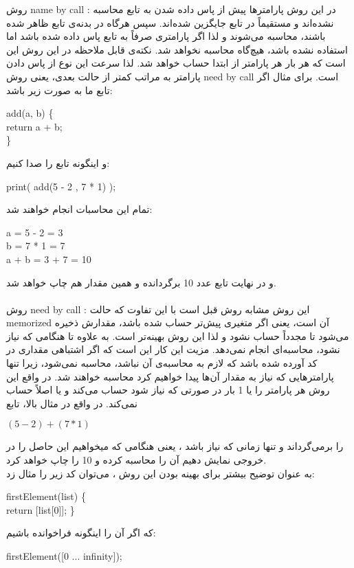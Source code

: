 

روش 
name by call
:
در این روش
پارامترها پیش از پاس داده شدن به تابع محاسبه نشده‌اند و مستقیماً
در تابع جایگزین شده‌اند.
 سپس هرگاه در بدنه‌ی تابع ظاهر شده باشند،
محاسبه می‌شوند و لذا اگر پارامتری صرفاً به تابع پاس داده شده باشد اما استفاده نشده باشد، هیچ‌گاه محاسبه نخواهد شد.
نکته‌ی قابل ملاحظه در این روش این است که
هر بار هر پارامتر از ابتدا حساب خواهد شد.
لذا سرعت این نوع از پاس دادن پارامتر به مراتب کمتر از حالت بعدی،
یعنی روش
need by call
است.
برای مثال اگر تابع ما به صورت زیر باشد:
\begin{latin}
add(a, b)
\small\{
\\
return a + b;
\\
\small\}
\end{latin}
و اینگونه تابع را صدا کنیم:
\\
\begin{latin}
print( add(5 - 2 , 7  * 1) );
\\
\end{latin}
تمام این محاسبات انجام خواهند شد:
\begin{latin}
a = 5 - 2 = 3
\\
b = 7 * 1 = 7
\\
a + b = 3 + 7 = 10
\end{latin}
و در نهایت تابع عدد 10 
برگردانده  و
همین مقدار هم چاپ خواهد شد.
\\ \\
روش
need by call
:
این روش مشابه روش قبل 
است با این تفاوت که
حالت
memorized
آن است،
یعنی اگر متغیری پیش‌تر حساب شده باشد،
مقدارش ذخیره می‌شود تا مجدداً حساب نشود
 و لذا این روش بهینه‌تر است.
به علاوه تا هنگامی
که نیاز نشود،
محاسبه‌ای انجام نمی‌دهد.
مزیت این کار این است که اگر اشتباهی مقداری در کد آورده شده باشد که لازم به محاسبه‌ی
آن نباشد،
محاسبه نمی‌شود،
زیرا تنها پارامترهایی که نیاز به مقدار آن‌ها پیدا خواهیم کرد محاسبه خواهند شد.
در واقع این روش
هر پارامتر را یا 1 بار در صورتی که نیاز شود حساب می‌کند و یا اصلاً حساب نمی‌کند.
در واقع در مثال بالا، 
تابع 
\begin{latin}
	$(5 - 2) + (7 * 1)$
\end{latin}
را برمی‌گرداند
و تنها زمانی که نیاز باشد ،
یعنی هنگامی که میخواهیم این حاصل را در خروجی نمایش دهیم 
آن را محاسبه کرده و 10 را چاپ خواهد کرد.
\\
به عنوان توضیح بیشتر برای بهینه بودن این روش ،
می‌توان کد زیر را مثال زد:
\begin{latin}
firstElement(list)
\small\{
\\
return [list[0]];
\small\}
\\
\end{latin}
که اگر آن را اینگونه فراخوانده باشیم:
\begin{latin}
firstElement([0 ... infinity]);
\end{latin}


